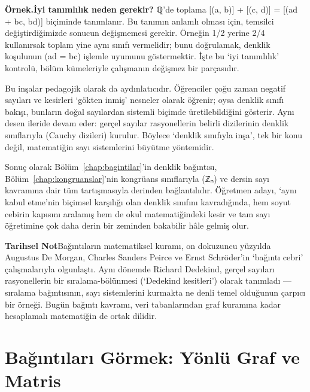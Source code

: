 \begin{tcolorbox}[bookbox,colback=cEx]\textbf{\textsf{\textcolor{cAcc}{Örnek.}}}\quad \textbf{İyi tanımlılık neden gerekir? }ℚ’de toplama [(a, b)] + [(c, d)] = [(ad + bc, bd)] biçiminde tanımlanır. Bu tanımın anlamlı olması için, temsilci değiştirdiğimizde sonucun değişmemesi gerekir. Örneğin 1/2 yerine 2/4 kullanırsak toplam yine aynı sınıfı vermelidir; bunu doğrulamak, denklik koşulunun (ad = bc) işlemle uyumunu göstermektir. İşte bu ‘iyi tanımlılık’ kontrolü, bölüm kümeleriyle çalışmanın değişmez bir parçasıdır.\end{tcolorbox}

Bu inşalar pedagojik olarak da aydınlatıcıdır. Öğrenciler çoğu zaman negatif sayıları ve kesirleri ‘gökten inmiş’ nesneler olarak öğrenir; oysa denklik sınıfı bakışı, bunların doğal sayılardan sistemli biçimde üretilebildiğini gösterir. Aynı desen ileride devam eder: gerçel sayılar rasyonellerin belirli dizilerinin denklik sınıflarıyla (Cauchy dizileri) kurulur. Böylece ‘denklik sınıfıyla inşa’, tek bir konu değil, matematiğin sayı sistemlerini büyütme yöntemidir.

Sonuç olarak Bölüm~\ref{chap:bagintilar}’in denklik bağıntısı, Bölüm~\ref{chap:kongruanslar}’nin kongrüans sınıflarıyla (ℤₙ) ve dersin sayı kavramına dair tüm tartışmasıyla derinden bağlantılıdır. Öğretmen adayı, ‘aynı kabul etme’nin biçimsel karşılığı olan denklik sınıfını kavradığında, hem soyut cebirin kapısını aralamış hem de okul matematiğindeki kesir ve tam sayı öğretimine çok daha derin bir zeminden bakabilir hâle gelmiş olur.

\begin{tcolorbox}[bookbox,colback=cDef]\textbf{\textsf{\textcolor{cAcc}{Tarihsel Not}}}\quad Bağıntıların matematiksel kuramı, on dokuzuncu yüzyılda Augustus De Morgan, Charles Sanders Peirce ve Ernst Schröder’in ‘bağıntı cebri’ çalışmalarıyla olgunlaştı. Aynı dönemde Richard Dedekind, gerçel sayıları rasyonellerin bir sıralama-bölünmesi (‘Dedekind kesitleri’) olarak tanımladı — sıralama bağıntısının, sayı sistemlerini kurmakta ne denli temel olduğunun çarpıcı bir örneği. Bugün bağıntı kavramı, veri tabanlarından graf kuramına kadar hesaplamalı matematiğin de ortak dilidir.\end{tcolorbox}

\section{Bağıntıları Görmek: Yönlü Graf ve Matris}

